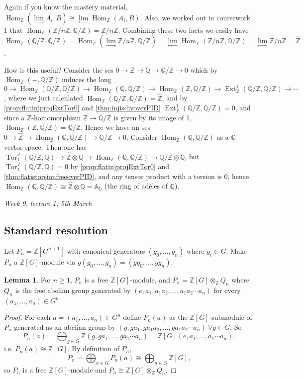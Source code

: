 \documentclass{article}
\newcommand{\A}{\mathbb{A}}
\newcommand{\Z}{\mathbb{Z}}
\newcommand{\Q}{\mathbb{Q}}
\newcommand{\Hom}{\operatorname{Hom}}
\newcommand{\Tor}{\operatorname{Tor}}
\newcommand{\Ext}{\operatorname{Ext}}
\newcommand{\zhat}{\widehat{\Z}}
\theoremstyle{definition}
\newtheorem{lemma}[defn]{Lemma}
\begin{document}
Again if you know the mastery material, $\Hom_\Z\left(\underset{\rightarrow}{\lim}A_i,B\right)\cong\underset{\leftarrow}{\lim}\Hom_\Z(A_i,B)$. Also, we worked out in coursework 1 that $\Hom_\Z(\Z/n\Z,\Q/\Z)=\Z/n\Z$. Combining these two facts we easily have $\Hom_\Z(\Q/\Z,\Q/\Z)=\Hom_\Z\left(\underset{\rightarrow}{\lim}\Z/n\Z,\Q/\Z\right)=\underset{\leftarrow}{\lim}\Hom_\Z(\Z/n\Z,\Q/\Z)=\underset{\leftarrow}{\lim}\Z/n\Z=\zhat$.

How is this useful? Consider the ses $0\rightarrow\Z\rightarrow\Q\rightarrow\Q/\Z\rightarrow 0$ which by $\Hom_\Z(-,\Q/\Z)$ induces the long $0\rightarrow\Hom_\Z(\Q/\Z,\Q/\Z)\rightarrow\Hom_\Z(\Q,\Q/\Z)\rightarrow\Hom_\Z(\Z,\Q/\Z)\rightarrow\Ext_\Z^1(\Q/\Z,\Q/\Z)\rightarrow\cdots$, where we just calculated $\Hom_\Z(\Q/\Z,\Q/\Z)=\zhat$, and by \ref{prop:flatinjprojExtTor0} and \ref{thm:injisdivoverPID} $\Ext_\Z^1(\Q/\Z,\Q/\Z)=0$, and since a $\Z$-homomorphism $\Z\rightarrow\Q/\Z$ is given by its image of 1, $\Hom_\Z(\Z,\Q/\Z)=\Q/\Z$. Hence we have an ses $0\rightarrow\zhat\rightarrow\Hom_\Z(\Q,\Q/\Z)\rightarrow\Q/\Z\rightarrow 0$. Consider $\Hom_\Z(\Q,\Q/\Z)$ as a $\Q$-vector space. Then one has $\Tor_1^\Z(\Q/\Z,\Q)\rightarrow\zhat\otimes\Q\rightarrow\Hom_\Z(\Q,\Q/\Z)\rightarrow\Q/\Z\otimes\Q$, but $\Tor_1^\Z(\Q/\Z,\Q)=0$ by \ref{prop:flatinjprojExtTor0} and \ref{thm:flatistorsionfreeoverPID}, and any tensor product with a torsion is 0, hence $\Hom_\Z(\Q,\Q/\Z)\cong\zhat\otimes\Q=\A_\Q$ (the ring of adèles of $\Q$).

\begin{flushright}
\textit{Week 9, lecture 1, 5th March}
\end{flushright}

\subsection{Standard resolution}

Let $P_n=\Z[G^{n+1}]$ with canonical generators $(g_0,\ldots,g_n)$ where $g_i\in G$. Make $P_n$ a $\Z[G]$-module via $g(g_0,\ldots,g_n)=(gg_0,\ldots,gg_n)$.

\begin{lemma}
For $n\geq 1$, $P_n$ is a free $\Z[G]$-module, and $P_n=\Z[G]\otimes_\Z Q_n$ where $Q_n$ is the free abelian group generated by $(e,a_1,a_1a_2,\ldots,a_1a_2\cdots a_n)$ for every $(a_1,\ldots,a_n)\in G^n$. 
\end{lemma}
\begin{proof}
For each $a=(a_1,\ldots,a_n)\in G^n$ define $P_n(a)$ as the $\Z[G]$-submodule of $P_n$ generated as an abelian group by $(g,ga_1,ga_1a_2,\ldots,ga_1a_2\cdots a_n) \ \forall g\in G$. So
\[
P_n(a)=\bigoplus_{g\in G}\Z (g,ga_1,\ldots,ga_1\cdots a_n)=\Z[G](e,a_1,\ldots,a_1\cdots a_n),
\]
i.e. $P_n(a)\cong \Z[G]$. By definition of $P_n$,
\[
P_n=\bigoplus_{a\in G}P_n(a)\cong\bigoplus_{a\in G}\Z[G],
\]
so $P_n$ is a free $\Z[G]$-module and $P_n\cong\Z[G]\otimes_\Z Q_n$.
\end{proof}
\end{document}
